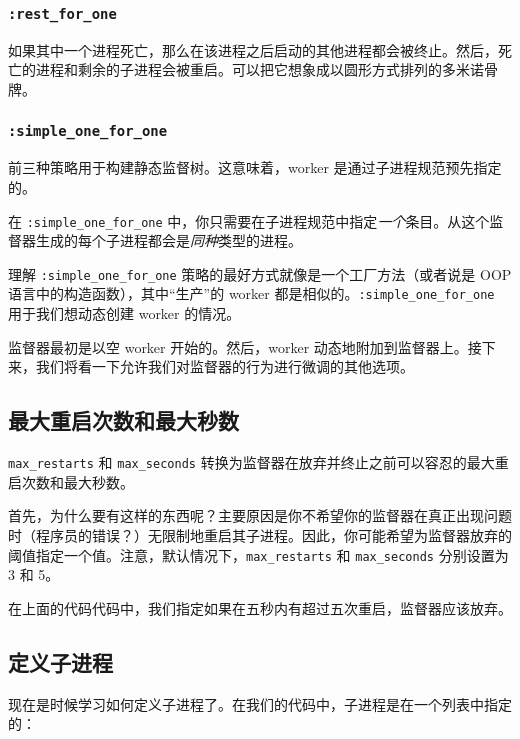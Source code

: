 \subsubsection{\texorpdfstring{\texttt{:rest\_for\_one}}{:rest\_for\_one}}

如果其中一个进程死亡，那么在该进程之后启动的其他进程都会被终止。然后，死亡的进程和剩余的子进程会被重启。可以把它想象成以圆形方式排列的多米诺骨牌。


\subsubsection{\texorpdfstring{\texttt{:simple\_one\_for\_one}}{:simple\_one\_for\_one}}

前三种策略用于构建静态监督树。这意味着，worker 是通过子进程规范预先指定的。

在 \texttt{:simple\_one\_for\_one}
中，你只需要在子进程规范中指定\emph{一个}条目。从这个监督器生成的每个子进程都会是\emph{同种}类型的进程。

理解 \texttt{:simple\_one\_for\_one}
策略的最好方式就像是一个工厂方法（或者说是 OOP
语言中的构造函数），其中``生产''的 worker
都是相似的。\texttt{:simple\_one\_for\_one}
用于我们想动态创建 worker 的情况。

监督器最初是以空 worker 开始的。然后，worker
动态地附加到监督器上。接下来，我们将看一下允许我们对监督器的行为进行微调的其他选项。


\subsection{最大重启次数和最大秒数}

\texttt{max\_restarts} 和
\texttt{max\_seconds}
转换为监督器在放弃并终止之前可以容忍的最大重启次数和最大秒数。

首先，为什么要有这样的东西呢？主要原因是你不希望你的监督器在真正出现问题时（程序员的错误？）无限制地重启其子进程。因此，你可能希望为监督器放弃的阈值指定一个值。注意，默认情况下，\texttt{max\_restarts}
和 \texttt{max\_seconds} 分别设置为 3 和 5。

在上面的代码代码中，我们指定如果在五秒内有超过五次重启，监督器应该放弃。

 \subsection{ 定义子进程}

现在是时候学习如何定义子进程了。在我们的代码中，子进程是在一个列表中指定的：

